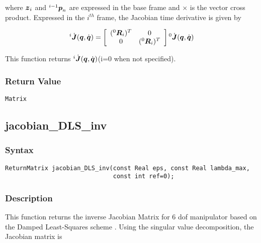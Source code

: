 \documentclass[11pt,fleqn,letterpaper]{report}
\newcommand{\mbold}[1]{\mbox{\boldmath $ #1 $}}
\begin{document}
where $\mbold{z}_i$ and $^{i-1}\mbold{p}_n$ are expressed in the base
frame and $\times$ is the vector cross product. Expressed in the
$i^{th}$ frame, the Jacobian time derivative is given by

\begin{eqnarray}
  ^i\dot{\mbold{J}}(\mbold{q},\dot{\mbold{q}}) =
  \left[
    \begin{array}{cc}
      (^0\mbold{R}_i)^T & 0 \\
      0 & (^0\mbold{R}_i)^T
    \end{array}
  \right] {^0}\dot{\mbold{J}}(\mbold{q},\dot{\mbold{q}})
\end{eqnarray}

This function returns $^i\dot{\mbold{J}}(\mbold{q},\dot{\mbold{q}})$(i=0 when not specified).

\subsubsection*{Return Value}

{\tt Matrix}
 \newpage 


\subsection*{jacobian\_DLS\_inv}
\subsubsection*{Syntax}
\begin{verbatim}
ReturnMatrix jacobian_DLS_inv(const Real eps, const Real lambda_max, 
                              const int ref=0);
\end{verbatim}

\subsubsection*{Description}   
This function returns the inverse Jacobian Matrix for 6 dof manipulator based on the Damped Least-Squares 
scheme \cite{Chiaverini94}. Using the singular value decomposition, the Jacobian matrix is
\end{document}
